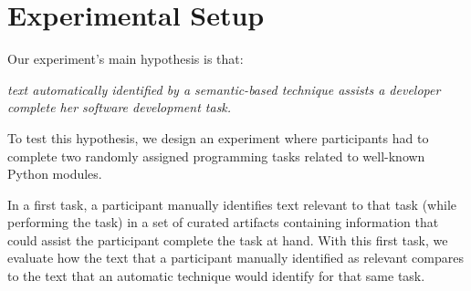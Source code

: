 \clearpage

\section{Experimental Setup}
\label{cp6:procedures}



Our experiment's main hypothesis is that:


\medskip
\begin{bluequote}
    \textit{text automatically identified by a semantic-based technique assists a 
    developer complete her software development task.} 
\end{bluequote}



To test this hypothesis, we design an experiment where  participants
 had to complete two randomly assigned programming tasks related to well-known Python modules. 
 

 
 


In a first task, a participant manually identifies text relevant to that task (while performing the task)
in a set of curated artifacts containing information that could assist the participant complete the task at hand.
With this first task, we evaluate how the text that a participant manually identified as relevant
compares to the text that an automatic technique would identify for that same task. 



